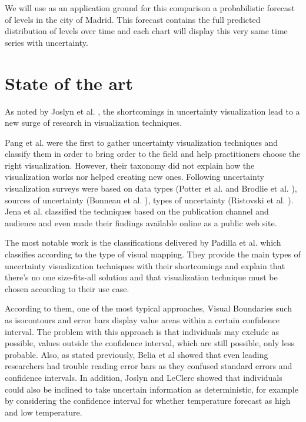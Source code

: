 \documentclass[a4paper,3p,sort&compress]{elsarticle}
\begin{document}
We will use as an application ground for this comparison a probabilistic forecast of \no levels 
in the city of Madrid. This forecast contains the full predicted distribution of \no levels over time
and each chart will display this very same time series with uncertainty. 

\section{State of the art}
\label{sec:results}

As noted by Joslyn et al. \cite{joslyn_communicating_2010}, the shortcomings in uncertainty visualization lead to a new surge of 
research in visualization techniques. 

Pang et al. \cite{pang_approaches_1997} were the first to gather uncertainty visualization techniques and classify them in 
order to bring order to the field and help 
practitioners choose the right visualization. However, their taxonomy did not explain how the visualization works nor helped creating new 
ones. Following uncertainty visualization surveys were based on data types (Potter et al. \cite{potter_quantification_2012} and Brodlie et al. 
\cite{brodlie_review_2012}), 
sources of uncertainty (Bonneau et al. \cite{bonneau_overview_2014}), types of uncertainty 
(Ristovski et al. \cite{ristovski_uncertainty_2014}). Jena et al. \cite{jena_uncertainty_2020} classified the techniques 
based on the publication channel and audience and even made their findings available online as a 
public web site. 

The most notable work is the classifications delivered by Padilla et al. \cite{padilla_uncertainty_2021} which classifies according to 
the type of visual mapping. They provide the main types of uncertainty visualization techniques with their shortcomings and 
explain that there's no one size-fits-all solution and that visualization technique must be chosen according to their use case.

According to them, one of the most typical approaches, Visual Boundaries such as isocontours and error 
bars display value areas within a certain confidence interval. The problem with this approach is 
that individuals may exclude as possible, values outside the confidence interval, which are still 
possible, only less probable. Also, as stated previously, Belia et al \cite{belia_researchers_2005} showed that even leading researchers had 
trouble reading error bars as they confused 
standard errors and confidence intervals. In addition, Joslyn and LeClerc \cite{joslyn_decisions_2013} 
showed that individuals could also be inclined to take uncertain 
information as deterministic, for example by considering the confidence interval for whether temperature 
forecast as high and low temperature. 
\end{document}
